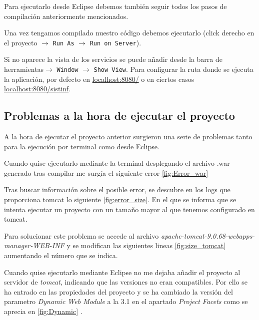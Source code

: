 
Para ejecutarlo desde Eclipse debemos también seguir todos los pasos de compilación anteriormente mencionados.

Una vez tengamos compilado nuestro código debemos ejecutarlo (click derecho en el proyecto $\rightarrow$ \texttt{Run As} $\rightarrow$ \texttt{Run on Server}).

Si no aparece la vista de los servicios se puede añadir desde la barra de herramientas$\rightarrow$ \texttt{Window} $\rightarrow$ \texttt{Show View}. Para configurar la ruta donde se ejecuta la aplicación, por defecto en \href{http://localhost:8080/}{localhost:8080/} o en ciertos casos \href{http://localhost:8080/sistinf}{localhost:8080/sistinf}.

\subsection{Problemas a la hora de ejecutar el proyecto}

A la hora de ejecutar el proyecto anterior surgieron una serie de problemas tanto para la ejecución por terminal como desde Eclipse.

Cuando quise ejecutarlo mediante la terminal desplegando el archivo .war generado tras compilar me surgía el siguiente error \ref{fig:Error_war}


Tras buscar información sobre el posible error, se descubre en los logs que proporciona tomcat lo siguiente \ref{fig:error_size}. En el que se informa que se intenta ejecutar un proyecto con un tamaño mayor al que tenemos configurado en tomcat.


Para solucionar este problema se accede al archivo \emph{apache-tomcat-9.0.68-webapps-manager-WEB-INF} y se modifican las siguientes lineas \ref{fig:size_tomcat} aumentando el número que se indica.


Cuando quise ejecutarlo mediante Eclipse no me dejaba añadir el proyecto al servidor de \emph{tomcat}, indicando que las versiones no eran compatibles. Por ello se ha entrado en las propiedades del proyecto y se ha cambiado la versión del parametro \emph{Dynamic Web Module} a la 3.1 en el apartado \emph{Project Facets} como se aprecia en \ref{fig:Dynamic} .

